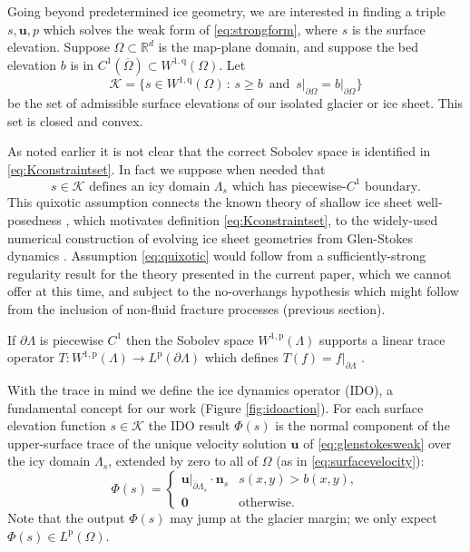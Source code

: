 \documentclass[letterpaper,final,12pt,reqno]{amsart}
\theoremstyle{claim}
\newcommand{\RR}{\mathbb{R}}
\newcommand{\bn}{\mathbf{n}}
\newcommand{\bu}{\mathbf{u}}
\newcommand{\bzero}{\bm{0}}
\newcommand{\pp}{{\text{p}}}
\newcommand{\qq}{{\text{q}}}
\numberwithin{equation}{section}
\numberwithin{figure}{section}
\numberwithin{table}{section}
\numberwithin{theorem}{section}
\begin{document}
Going beyond predetermined ice geometry, we are interested in finding a triple $s,\bu,p$ which solves the weak form of \eqref{eq:strongform}, where $s$ is the surface elevation.  Suppose $\Omega \subset \RR^d$ is the map-plane domain, and suppose the bed elevation $b$ is in $C^1(\overline{\Omega}) \subset W^{1,\qq}(\Omega)$.  Let
\begin{equation}
\mathcal{K} = \{s \in W^{1,\qq}(\Omega) \,:\, s \ge b \, \text{ and } \, s\big|_{\partial\Omega} = b\big|_{\partial\Omega}\}  \label{eq:Kconstraintset}
\end{equation}
be the set of admissible surface elevations of our isolated glacier or ice sheet.  This set is closed and convex.

As noted earlier it is not clear that the correct Sobolev space is identified in \eqref{eq:Kconstraintset}.  In fact we suppose when needed that
\begin{equation}
s\in \mathcal{K} \text{ defines an icy domain } \Lambda_s \text{ which has piecewise-$C^1$ boundary.} \label{eq:quixotic}
\end{equation}
This quixotic assumption connects the known theory of shallow ice sheet well-posedness \cite{JouvetBueler2012}, which motivates definition \eqref{eq:Kconstraintset}, to the widely-used numerical construction of evolving ice sheet geometries from Glen-Stokes dynamics \cite{Jouvetetal2008,Lengetal2012}.  Assumption \eqref{eq:quixotic} would follow from a sufficiently-strong regularity result for the theory presented in the current paper, which we cannot offer at this time, and subject to the no-overhangs hypothesis which might follow from the inclusion of non-fluid fracture processes (previous section).

If $\partial \Lambda$ is piecewise $C^1$ then the Sobolev space $W^{1,\pp}(\Lambda)$ supports a linear trace operator $T:W^{1,\pp}(\Lambda) \to L^\pp(\partial \Lambda)$ which defines $T(f) = f|_{\partial \Lambda}$ \cite[Section 5.5]{Evans2010}.

With the trace in mind we define the ice dynamics operator (IDO), a fundamental concept for our work (Figure \ref{fig:idoaction}).  For each surface elevation function $s \in \mathcal{K}$ the IDO result $\Phi(s)$ is the normal component of the upper-surface trace of the unique velocity solution $\bu$ of \eqref{eq:glenstokesweak} over the icy domain $\Lambda_s$, extended by zero to all of $\Omega$ (as in \eqref{eq:surfacevelocity}):
\begin{equation}
\Phi(s) = \begin{cases} \bu\big|_{\overline{\partial} \Lambda_s} \cdot \bn_s & s(x,y) > b(x,y), \\
                        \bzero & \text{otherwise}. \end{cases} \label{eq:ido}
\end{equation}
Note that the output $\Phi(s)$ may jump at the glacier margin; we only expect $\Phi(s) \in L^\pp(\Omega)$.
\end{document}

